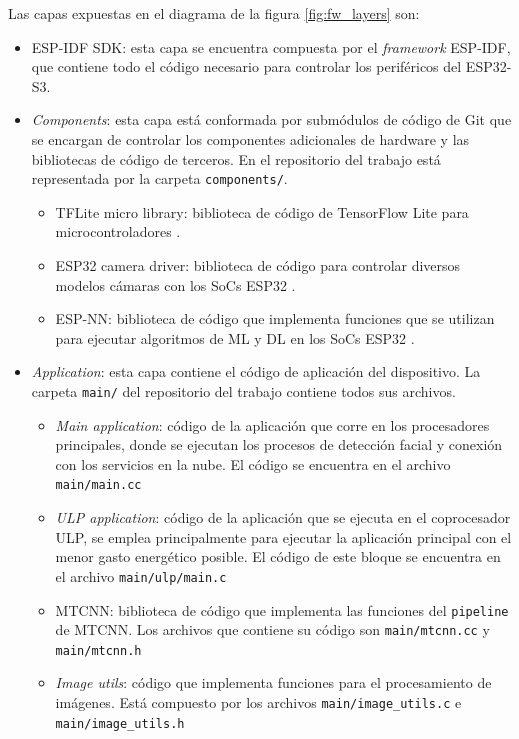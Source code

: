 Las capas expuestas en el diagrama de la figura \ref{fig:fw_layers} son:
\begin{itemize}
	\item ESP-IDF SDK: esta capa se encuentra compuesta por el \textit{framework} ESP-IDF, que contiene todo el código necesario para controlar los periféricos del ESP32-S3.
	\item \textit{Components}: esta capa está conformada por submódulos de código de Git que se encargan de controlar los componentes adicionales de hardware y las bibliotecas de código de terceros. En el repositorio del trabajo \cite{mtcnn_repo} está representada por la carpeta \texttt{components/}.
	\begin{itemize}
		\item TFLite micro library: biblioteca de código de TensorFlow Lite para microcontroladores \cite{tflm_repo}.
		\item ESP32 camera driver: biblioteca de código para controlar diversos modelos cámaras con los SoCs ESP32 \cite{esp32cam_repo}.
		\item ESP-NN: biblioteca de código que implementa funciones que se utilizan para ejecutar algoritmos de ML y DL en los SoCs ESP32 \cite{espnn_repo}.
	\end{itemize}
	\item \textit{Application}: esta capa contiene el código de aplicación del dispositivo. La carpeta \texttt{main/} del repositorio del trabajo \cite{mtcnn_repo} contiene todos sus archivos.
	\begin{itemize}
		\item \textit{Main application}: código de la aplicación que corre en los procesadores principales, donde se ejecutan los procesos de detección facial y conexión con los servicios en la nube. El código se encuentra en el archivo \texttt{main/main.cc}
		\item \textit{ULP application}: código de la aplicación que se ejecuta en el coprocesador ULP, se emplea principalmente para ejecutar la aplicación principal con el menor gasto energético posible. El código de este bloque se encuentra en el archivo \texttt{main/ulp/main.c}
		\item MTCNN: biblioteca de código que implementa las funciones del \texttt{pipeline} de MTCNN. Los archivos que contiene su código son \texttt{main/mtcnn.cc} y \texttt{main/mtcnn.h}
		\item \textit{Image utils}: código que implementa funciones para el procesamiento de imágenes. Está compuesto por los archivos \texttt{main/image\_utils.c} e \texttt{main/image\_utils.h}
	\end{itemize}
\end{itemize}

